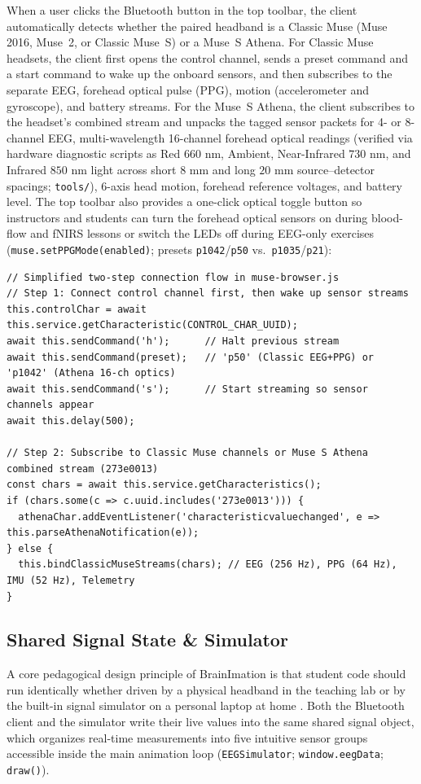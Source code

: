 \documentclass[11pt]{article}
\begin{document}
When a user clicks the Bluetooth button in the top toolbar, the client automatically detects whether the paired headband is a Classic Muse (Muse 2016, Muse~2, or Classic Muse~S) or a Muse~S Athena. For Classic Muse headsets, the client first opens the control channel, sends a preset command and a start command to wake up the onboard sensors, and then subscribes to the separate EEG, forehead optical pulse (PPG), motion (accelerometer and gyroscope), and battery streams. For the Muse~S Athena, the client subscribes to the headset's combined stream and unpacks the tagged sensor packets for 4- or 8-channel EEG, multi-wavelength 16-channel forehead optical readings (verified via hardware diagnostic scripts as Red $660\text{ nm}$, Ambient, Near-Infrared $730\text{ nm}$, and Infrared $850\text{ nm}$ light across short $8\text{ mm}$ and long $20\text{ mm}$ source--detector spacings; \texttt{tools/}), 6-axis head motion, forehead reference voltages, and battery level. The top toolbar also provides a one-click optical toggle button so instructors and students can turn the forehead optical sensors on during blood-flow and fNIRS lessons or switch the LEDs off during EEG-only exercises (\texttt{muse.setPPGMode(enabled)}; presets \texttt{p1042}/\texttt{p50} vs.\ \texttt{p1035}/\texttt{p21}):

\noindent\begin{minipage}{\textwidth}
\begin{lstlisting}
// Simplified two-step connection flow in muse-browser.js
// Step 1: Connect control channel first, then wake up sensor streams
this.controlChar = await this.service.getCharacteristic(CONTROL_CHAR_UUID);
await this.sendCommand('h');      // Halt previous stream
await this.sendCommand(preset);   // 'p50' (Classic EEG+PPG) or 'p1042' (Athena 16-ch optics)
await this.sendCommand('s');      // Start streaming so sensor channels appear
await this.delay(500);

// Step 2: Subscribe to Classic Muse channels or Muse S Athena combined stream (273e0013)
const chars = await this.service.getCharacteristics();
if (chars.some(c => c.uuid.includes('273e0013'))) {
  athenaChar.addEventListener('characteristicvaluechanged', e => this.parseAthenaNotification(e));
} else {
  this.bindClassicMuseStreams(chars); // EEG (256 Hz), PPG (64 Hz), IMU (52 Hz), Telemetry
}
\end{lstlisting}
\end{minipage}
\vspace{4pt}

\subsection{Shared Signal State \& Simulator}
A core pedagogical design principle of BrainImation is that student code should run identically whether driven by a physical headband in the teaching lab or by the built-in signal simulator on a personal laptop at home \citep{deleeuw2023simulating}. Both the Bluetooth client and the simulator write their live values into the same shared signal object, which organizes real-time measurements into five intuitive sensor groups accessible inside the main animation loop (\texttt{EEGSimulator}; \texttt{window.eegData}; \texttt{draw()}).
\end{document}
